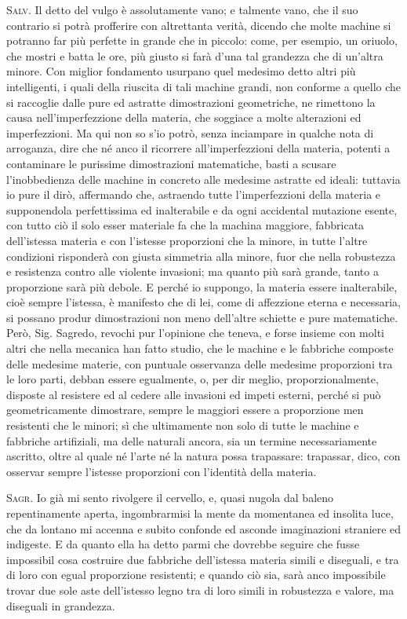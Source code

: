 \documentclass[11pt,twoside,openany]{book}
\newcommand{\speaker}[1]{\textcolor{rubric}{\textsc{#1}}\space}
\begin{document}
\speaker{Salv.} Il detto del vulgo è assolutamente vano; e talmente vano, che il suo contrario si potrà profferire con altrettanta verità, dicendo che molte machine si potranno far più perfette in grande che in piccolo: come, per esempio, un oriuolo, che mostri e batta le ore, più giusto si farà d'una tal grandezza che di un'altra minore. Con miglior fondamento usurpano quel medesimo detto altri più intelligenti, i quali della riuscita di tali machine grandi, non conforme a quello che si raccoglie dalle pure ed astratte dimostrazioni geometriche, ne rimettono la causa nell'imperfezzione della materia, che soggiace a molte alterazioni ed imperfezzioni. Ma qui non so s'io potrò, senza inciampare in qualche nota di arroganza, dire che né anco il ricorrere all'imperfezzioni della materia, potenti a contaminare le purissime dimostrazioni matematiche, basti a scusare l'inobbedienza delle machine in concreto alle medesime astratte ed ideali: tuttavia io pure il dirò, affermando che, astraendo tutte l'imperfezzioni della materia e supponendola perfettissima ed inalterabile e da ogni accidental mutazione esente, con tutto ciò il solo esser materiale fa che la machina maggiore, fabbricata dell'istessa materia e con l'istesse proporzioni che la minore, in tutte l'altre condizioni risponderà con giusta simmetria alla minore, fuor che nella robustezza e resistenza contro alle violente invasioni; ma quanto più sarà grande, tanto a proporzione sarà più debole. E perché io suppongo, la materia essere inalterabile, cioè sempre l'istessa, è manifesto che di lei, come di affezzione eterna e necessaria, si possano produr dimostrazioni non meno dell'altre schiette e pure matematiche. Però, Sig. Sagredo, revochi pur l'opinione che teneva, e forse insieme con molti altri che nella mecanica han fatto studio, che le machine e le fabbriche composte delle medesime materie, con puntuale osservanza delle medesime proporzioni tra le loro parti, debban essere egualmente, o, per dir meglio, proporzionalmente, disposte al resistere ed al cedere alle invasioni ed impeti esterni, perché si può geometricamente dimostrare, sempre le maggiori essere a proporzione men resistenti che le minori; sì che ultimamente non solo di tutte le machine e fabbriche artifiziali, ma delle naturali ancora, sia un termine necessariamente ascritto, oltre al quale né l'arte né la natura possa trapassare: trapassar, dico, con osservar sempre l'istesse proporzioni con l'identità della materia.

\speaker{Sagr.} Io già mi sento rivolgere il cervello, e, quasi nugola dal baleno repentinamente aperta, ingombrarmisi la mente da momentanea ed insolita luce, che da lontano mi accenna e subito confonde ed asconde imaginazioni straniere ed indigeste. E da quanto ella ha detto parmi che dovrebbe seguire che fusse impossibil cosa costruire due fabbriche dell'istessa materia simili e diseguali, e tra di loro con egual proporzione resistenti; e quando ciò sia, sarà anco impossibile trovar due sole aste dell'istesso legno tra di loro simili in robustezza e valore, ma diseguali in grandezza.
\end{document}
